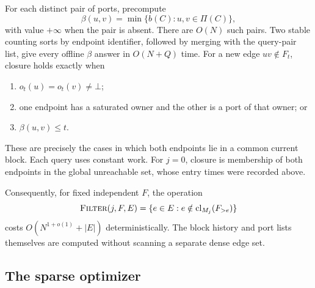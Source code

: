 \documentclass[11pt,a4paper]{article}
\theoremstyle{definition}
\theoremstyle{remark}
\newcommand{\clj}[2]{\operatorname{cl}_{M_{#1}}(#2)}
\newcommand{\Filter}{\textsc{Filter}}
\newcommand{\birth}{b}
\newcommand{\botval}{\bot}
\begin{document}
For each distinct pair of ports, precompute
\[
 \beta(u,v)=\min\{\birth(C):u,v\in\Pi(C)\},
\]
with value $+\infty$ when the pair is absent. There are
$O(N)$ such pairs. Two stable counting sorts by endpoint
identifier, followed by merging with the query-pair list,
give every offline $\beta$ answer in $O(N+Q)$ time.
For a new edge $uv\notin F_t$, closure holds exactly when
\begin{enumerate}
 \item $o_t(u)=o_t(v)\ne\botval$;
 \item one endpoint has a saturated owner and the other is
 a port of that owner; or
 \item $\beta(u,v)\leq t$.
\end{enumerate}
These are precisely the cases in which both endpoints lie
in a common current block. Each query uses constant work.
For $j=0$, closure is membership of both endpoints in the
global unreachable set, whose entry times were recorded above.

Consequently, for fixed independent $F$, the operation
\[
 \Filter(j,F,E)=
 \{e\in E:e\notin\clj j{F_{>e}}\}
\]
costs $O(N^{1+o(1)}+|E|)$ deterministically.
The block history and port lists themselves are computed
without scanning a separate dense edge set.

\subsection{The sparse optimizer}
\end{document}
